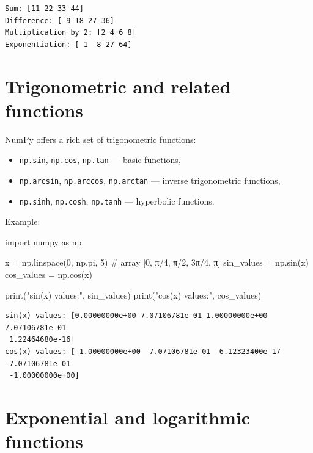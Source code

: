 \documentclass[
  english,
  letterpaper,
  DIV=11,
  numbers=noendperiod]{scrreprt}
\newenvironment{Shaded}{\begin{snugshade}}{\end{snugshade}}
\newcommand{\BuiltInTok}[1]{\textcolor[rgb]{0.00,0.23,0.31}{#1}}
\newcommand{\CommentTok}[1]{\textcolor[rgb]{0.37,0.37,0.37}{#1}}
\newcommand{\DecValTok}[1]{\textcolor[rgb]{0.68,0.00,0.00}{#1}}
\newcommand{\ImportTok}[1]{\textcolor[rgb]{0.00,0.46,0.62}{#1}}
\newcommand{\NormalTok}[1]{\textcolor[rgb]{0.00,0.23,0.31}{#1}}
\newcommand{\OperatorTok}[1]{\textcolor[rgb]{0.37,0.37,0.37}{#1}}
\newcommand{\StringTok}[1]{\textcolor[rgb]{0.13,0.47,0.30}{#1}}
\providecommand{\tightlist}{%
  \setlength{\itemsep}{0pt}\setlength{\parskip}{0pt}}
\begin{document}
\begin{verbatim}
Sum: [11 22 33 44]
Difference: [ 9 18 27 36]
Multiplication by 2: [2 4 6 8]
Exponentiation: [ 1  8 27 64]
\end{verbatim}

\section{Trigonometric and related
functions}\label{trigonometric-and-related-functions}

NumPy offers a rich set of trigonometric functions:

\begin{itemize}
\tightlist
\item
  \texttt{np.sin}, \texttt{np.cos}, \texttt{np.tan} --- basic functions,
\item
  \texttt{np.arcsin}, \texttt{np.arccos}, \texttt{np.arctan} --- inverse
  trigonometric functions,
\item
  \texttt{np.sinh}, \texttt{np.cosh}, \texttt{np.tanh} --- hyperbolic
  functions.
\end{itemize}

Example:

\begin{Shaded}
\begin{Highlighting}[]
\ImportTok{import}\NormalTok{ numpy }\ImportTok{as}\NormalTok{ np}

\NormalTok{x }\OperatorTok{=}\NormalTok{ np.linspace(}\DecValTok{0}\NormalTok{, np.pi, }\DecValTok{5}\NormalTok{) }\CommentTok{\# array [0, π/4, π/2, 3π/4, π]}
\NormalTok{sin\_values }\OperatorTok{=}\NormalTok{ np.sin(x)}
\NormalTok{cos\_values }\OperatorTok{=}\NormalTok{ np.cos(x)}

\BuiltInTok{print}\NormalTok{(}\StringTok{"sin(x) values:"}\NormalTok{, sin\_values)}
\BuiltInTok{print}\NormalTok{(}\StringTok{"cos(x) values:"}\NormalTok{, cos\_values)}
\end{Highlighting}
\end{Shaded}

\begin{verbatim}
sin(x) values: [0.00000000e+00 7.07106781e-01 1.00000000e+00 7.07106781e-01
 1.22464680e-16]
cos(x) values: [ 1.00000000e+00  7.07106781e-01  6.12323400e-17 -7.07106781e-01
 -1.00000000e+00]
\end{verbatim}

\section{Exponential and logarithmic
functions}\label{exponential-and-logarithmic-functions}
\end{document}
